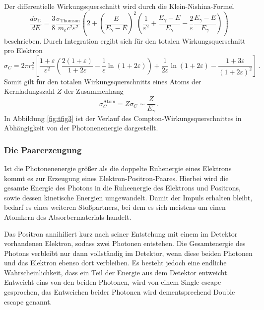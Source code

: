 \noindent
Der differentielle Wirkungsquerschnitt wird durch die Klein-Nishina-Formel
\begin{equation}
    \label{eq:diffwirkung}
\frac{d \sigma_C}{dE} = \frac{3}{8}\frac{\sigma_{\text{Thomson}}}{m_e c^2 \varepsilon^2}\left(2+\left(\frac{E}{E_{\gamma}-E}\right)^2
\left(\frac{1}{\varepsilon^2}+\frac{E_{\gamma}-E}{E_{\gamma}}-\frac{2}{\varepsilon}\frac{E_{\gamma}-E}{E_{\gamma}}\right)\right)
\end{equation}
beschrieben. 
Durch Integration ergibt sich für den totalen Wirkungsquerschnitt pro Elektron \cite{quelle03}
\begin{equation}
\sigma_C = 2\pi r_e^2\left[\frac{1+\varepsilon}{\varepsilon^2}\left(\frac{2(1+\varepsilon)}{1+2\varepsilon}-\frac{1}{\varepsilon}\ln(1+2\varepsilon)\right)
+\frac{1}{2\varepsilon}\ln(1+2\varepsilon)-\frac{1+3\varepsilon}{(1+2\varepsilon)^2}\right]\, .
\end{equation}
Somit gilt für den totalen Wirkungsquerschnitts eines Atoms der Kernladungszahl $Z$ der Zusammenhang
\begin{equation}
\sigma_C^{\text{Atom}} = Z \sigma_C \sim \frac{Z}{E_{\gamma}}\, .
\end{equation}
In Abbildung \ref{fig:tfig3} ist der Verlauf des Compton-Wirkungsquerschnittes in Abhängigkeit von der Photonenenergie dargestellt.

\subsubsection*{Die Paarerzeugung}\label{sec:paar}
Ist die Photonenenergie größer als die doppelte Ruhenergie eines Elektrons kommt es zur Erzeugung eines Elektron-Positron-Paares.
Hierbei wird die gesamte Energie des Photons in die Ruheenergie des Elektrons und Positrons, sowie dessen kinetische Energien umgewandelt.
Damit der Impuls erhalten bleibt, bedarf es eines weiteren Stoßpartners, bei dem es sich meistens um einen Atomkern des Absorbermaterials handelt.

Das Positron annihiliert kurz nach seiner Entstehung mit einem im Detektor vorhandenen Elektron, sodass zwei Photonen entstehen.
Die Gesamtenergie des Photons verbleibt nur dann vollständig im Detektor, wenn diese beiden Photonen und das Elektron ebenso dort verbleiben.
Es besteht jedoch eine endliche Wahrscheinlichkeit, dass ein Teil der Energie aus dem Detektor entweicht.
Entweicht eins von den beiden Photonen, wird von einem Single escape gesprochen, das Entweichen beider Photonen wird dementsprechend Double escape genannt.


